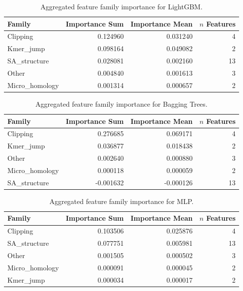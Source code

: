 \begin{table}[H]
\centering
\caption{Aggregated feature family importance for LightGBM.}
\label{tab:fam_lightgbm}
\begin{tabular}{lrrr}
\toprule
Family & Importance Sum & Importance Mean & $n$ Features \\
\midrule
Clipping & 0.124960 & 0.031240 & 4 \\
Kmer\_jump & 0.098164 & 0.049082 & 2 \\
SA\_structure & 0.028081 & 0.002160 & 13 \\
Other & 0.004840 & 0.001613 & 3 \\
Micro\_homology & 0.001314 & 0.000657 & 2 \\
\bottomrule
\end{tabular}
\end{table}

\begin{table}[H]
\centering
\caption{Aggregated feature family importance for Bagging Trees.}
\label{tab:fam_bagging}
\begin{tabular}{lrrr}
\toprule
Family & Importance Sum & Importance Mean & $n$ Features \\
\midrule
Clipping & 0.276685 & 0.069171 & 4 \\
Kmer\_jump & 0.036877 & 0.018438 & 2 \\
Other & 0.002640 & 0.000880 & 3 \\
Micro\_homology & 0.000118 & 0.000059 & 2 \\
SA\_structure & -0.001632 & -0.000126 & 13 \\
\bottomrule
\end{tabular}
\end{table}

\begin{table}[H]
\centering
\caption{Aggregated feature family importance for MLP.}
\label{tab:fam_mlp}
\begin{tabular}{lrrr}
\toprule
Family & Importance Sum & Importance Mean & $n$ Features \\
\midrule
Clipping & 0.103506 & 0.025876 & 4 \\
SA\_structure & 0.077751 & 0.005981 & 13 \\
Other & 0.001505 & 0.000502 & 3 \\
Micro\_homology & 0.000091 & 0.000045 & 2 \\
Kmer\_jump & 0.000034 & 0.000017 & 2 \\
\bottomrule
\end{tabular}
\end{table}

\FloatBarrier